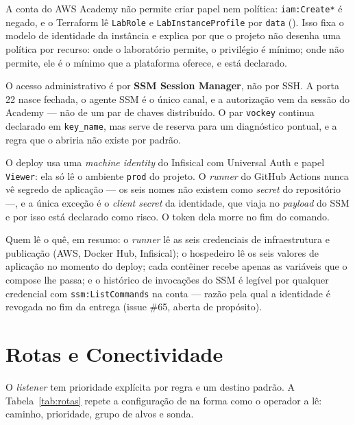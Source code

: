 \documentclass[11pt,a4paper]{article}
\begin{document}
A conta do AWS Academy não permite criar papel nem política: \texttt{iam:Create*} é negado, e o
Terraform lê \texttt{LabRole} e \texttt{LabInstanceProfile} por \texttt{data}
(). Isso fixa o modelo de identidade da instância e explica por que o projeto
não desenha uma política por recurso: onde o laboratório permite, o privilégio é mínimo; onde não
permite, ele é o mínimo que a plataforma oferece, e está declarado.

O acesso administrativo é por \textbf{SSM Session Manager}, não por SSH. A porta 22 nasce fechada, o
agente SSM é o único canal, e a autorização vem da sessão do Academy --- não de um par de chaves
distribuído. O par \texttt{vockey} continua declarado em \texttt{key\_name}, mas serve de reserva
para um diagnóstico pontual, e a regra que o abriria não existe por padrão.

O deploy usa uma \emph{machine identity} do Infisical com Universal Auth e papel \texttt{Viewer}:
ela só lê o ambiente \texttt{prod} do projeto. O \emph{runner} do GitHub Actions nunca vê segredo de
aplicação --- os seis nomes não existem como \emph{secret} do repositório ---, e a única exceção é o
\emph{client secret} da identidade, que viaja no \emph{payload} do SSM e por isso está declarado como
risco. O token dela morre no fim do comando.

Quem lê o quê, em resumo: o \emph{runner} lê as seis credenciais de infraestrutura e publicação
(AWS, Docker Hub, Infisical); o hospedeiro lê os seis valores de aplicação no momento do deploy; cada
contêiner recebe apenas as variáveis que o compose lhe passa; e o histórico de invocações do SSM é
legível por qualquer credencial com \texttt{ssm:ListCommands} na conta --- razão pela qual a
identidade é revogada no fim da entrega (issue \#65, aberta de propósito).

\section{Rotas e Conectividade}

O \emph{listener} tem prioridade explícita por regra e um destino padrão. A
Tabela~\ref{tab:rotas} repete a configuração de  na forma como o operador a
lê: caminho, prioridade, grupo de alvos e sonda.
\end{document}
